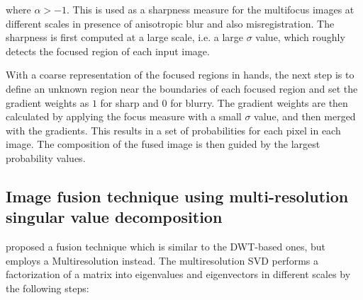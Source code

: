 \noindent where $\alpha > -1$. This is used as a sharpness measure for the multifocus images at different scales in presence of anisotropic blur and also misregistration. The sharpness is first computed at a large scale, i.e. a large $\sigma$ value, which roughly detects the focused region of each input image.

With a coarse representation of the focused regions in hands, the next step is to define an unknown region near the boundaries of each focused region and set the gradient weights as $1$ for sharp and $0$ for blurry. The gradient weights are then calculated by applying the focus measure with a small $\sigma$ value, and then merged with the gradients. This results in a set of probabilities for each pixel in each image. The composition of the fused image is then guided by the largest probability values.

\subsection{Image fusion technique using multi-resolution singular value decomposition}

 proposed a fusion technique which is similar to the DWT-based ones, but employs a Multiresolution  instead. The multiresolution SVD performs a factorization of a matrix into eigenvalues and eigenvectors in different scales by the following steps:

